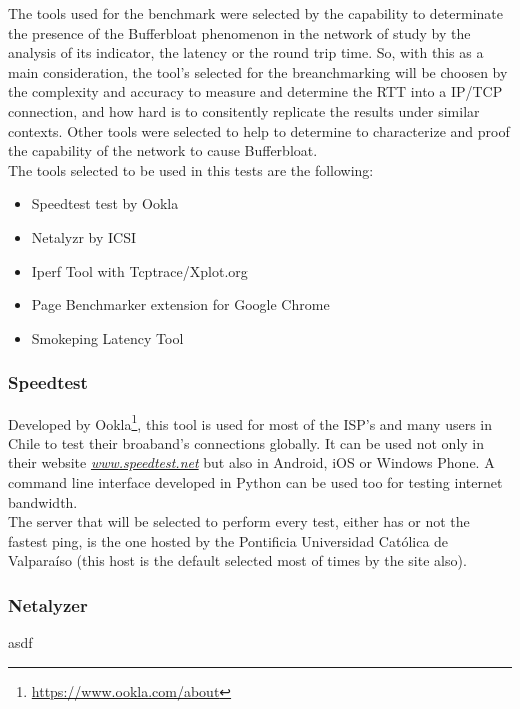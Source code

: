 The tools used for the benchmark were selected by the capability to determinate 
the presence of the Bufferbloat phenomenon in the network of study by the 
analysis of its indicator, the latency or the round trip time. So, with this as 
 a main consideration, the tool's selected for the breanchmarking will be
choosen by the complexity and accuracy to measure and determine the RTT into a
IP/TCP connection, and how hard is to consitently replicate the results under 
similar contexts. Other tools were selected to help to determine to 
characterize and proof the capability of the network to cause Bufferbloat.\\

The tools selected to be used in this tests are the following:

\begin{itemize}
    \item Speedtest test by Ookla
    \item Netalyzr by ICSI
    \item Iperf Tool with Tcptrace/Xplot.org
    \item Page Benchmarker extension for Google Chrome
    \item Smokeping Latency Tool
\end{itemize}

\subsubsection{Speedtest}

Developed by Ookla\footnote{\url{https://www.ookla.com/about}}, this tool is used
for most of the ISP's and many users in Chile to test their broaband's
connections globally. It can be used not only in their website 
\href{http://www.speedtest.net}{\textit{www.speedtest.net}} but also in Android,
iOS or Windows Phone. A command line interface developed in Python can be used 
too for testing internet bandwidth.\\

The server that will be selected to perform every test, either has or not the
fastest ping, is the one hosted by the Pontificia Universidad Cat\'olica de
Valpara\'iso (this host is the default selected most of times by the site also).  

\subsubsection{Netalyzer\cite{netalyzr}}

asdf

